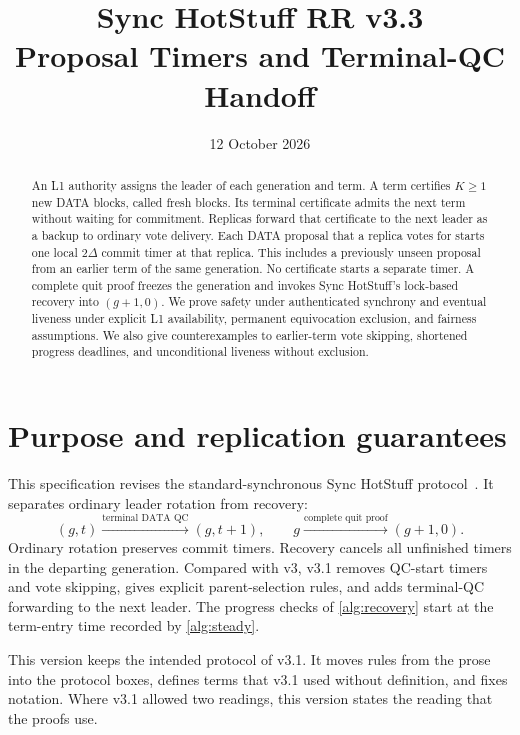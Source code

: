 \documentclass[11pt,a4paper]{article}
\title{Sync HotStuff RR v3.3\\\large Proposal Timers and Terminal-QC Handoff}
\author{}\date{12 October 2026}
\newcounter{protocol}
\begin{document}
\maketitle
\begin{abstract}
An L1 authority assigns the leader of each generation and term.
A term certifies $K\ge1$ new DATA blocks, called fresh blocks. Its
terminal certificate admits the next term without waiting for commitment.
Replicas forward that certificate to the next leader as a backup to
ordinary vote delivery. Each DATA proposal that a replica votes for
starts one local $2\Delta$ commit timer at that replica. This includes a
previously unseen proposal from an earlier term of the same generation.
No certificate starts a separate timer. A complete quit proof freezes the
generation and invokes Sync HotStuff's lock-based recovery into $(g+1,0)$.
We prove safety under authenticated synchrony and eventual liveness under
explicit L1 availability, permanent equivocation exclusion, and fairness
assumptions. We also give counterexamples to earlier-term vote skipping,
shortened progress deadlines, and unconditional liveness without exclusion.
\end{abstract}

\section{Purpose and replication guarantees}
\label{sec:scope}
This specification revises the standard-synchronous Sync HotStuff
protocol~\cite{sync}. It separates ordinary leader rotation from recovery:
\[
 (g,t)\xrightarrow{\text{terminal DATA QC}}(g,t+1),
 \qquad
 g\xrightarrow{\text{complete quit proof}}(g+1,0).
\]
Ordinary rotation preserves commit timers. Recovery cancels all unfinished
timers in the departing generation. Compared with v3, v3.1 removes
QC-start timers and vote skipping, gives explicit parent-selection rules,
and adds terminal-QC forwarding to the next leader.
 The progress checks of \cref{alg:recovery} start at
the term-entry time recorded by \cref{alg:steady}.

This version keeps the intended protocol of v3.1. It moves rules from
the prose into the protocol boxes, defines terms that v3.1 used without
definition, and fixes notation. Where v3.1 allowed two readings, this
version states the reading that the proofs use.
\end{document}
